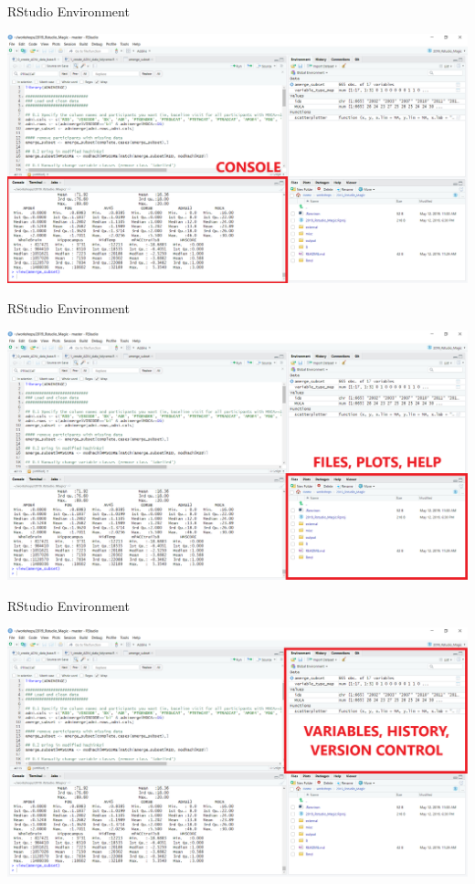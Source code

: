 \documentclass[ignorenonframetext,]{beamer}
\begin{document}
\begin{frame}{RStudio Environment}
\protect\hypertarget{rstudio-environment-1}{}

\includegraphics{../external/images/rstudio_terminal_1_CONSOLE.png}

\end{frame}

\begin{frame}{RStudio Environment}
\protect\hypertarget{rstudio-environment-2}{}

\includegraphics{../external/images/rstudio_terminal_2_FILES.png}

\end{frame}

\begin{frame}{RStudio Environment}
\protect\hypertarget{rstudio-environment-3}{}

\includegraphics{../external/images/rstudio_terminal_3_ENV.png}

\end{frame}
\end{document}
